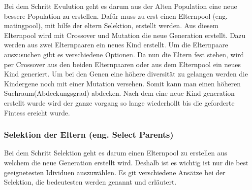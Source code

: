 Bei dem Schritt Evulution geht es darum aus der Alten Population eine neue bessere Population zu erstellen. Dafür muss zu erst einen Elternpool (eng. matingpool), mit hilfe der eltern Selektion, erstellt werden. Aus diesem Elternpool wird mit Crossover und Mutation die neue Generation erstellt. 
Dazu  werden aus zwei Elternpaaren ein neues Kind erstellt.
Um die Elternpaare auszusuchen gibt es verschiedene Optionen. Da nun die Eltern fest stehen, wird per Crossover aus den beiden Elternpaaren oder aus dem Elternpool ein neues Kind generiert. Um bei den Genen eine höhere diversität zu gelangen werden die Kindergene noch mit einer Mutation versehen. Somit kann man einen höheren Suchraum(Abdeckungsgrad) abdecken. Nach dem eine neue Kind generation erstellt wurde wird der ganze vorgang so lange wiederhollt bis die geforderte Fintess ereicht wurde.

\fi

\subsubsection{Selektion der Eltern (eng. Select Parents)}
Bei dem Schritt Selektion geht es darum einen Elternpool zu erstellen aus welchem die neue Generation erstellt wird. Deshalb ist es wichtig ist nur die best geeignetesten Idividuen auszuwählen. Es git verschiedene Ansätze bei der Selektion, die bedeutesten werden genannt und erläutert.

